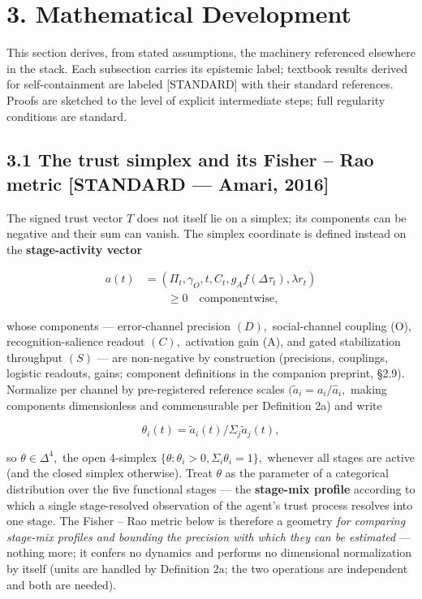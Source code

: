 \documentclass[
]{article}
\begin{document}
\section{3. Mathematical Development}\label{mathematical-development}

This section derives, from stated assumptions, the machinery referenced
elsewhere in the stack. Each subsection carries its epistemic label;
textbook results derived for self-containment are labeled {[}STANDARD{]}
with their standard references. Proofs are sketched to the level of
explicit intermediate steps; full regularity conditions are standard.

\subsection{3.1 The trust simplex and its Fisher -- Rao metric
{[}STANDARD --- Amari,
2016{]}}\label{the-trust-simplex-and-its-fisher-rao-metric-standard-amari-2016}

The signed trust vector \(T\) does not itself lie on a simplex; its
components can be negative and their sum can vanish. The simplex
coordinate is defined instead on the \textbf{stage-activity vector}

\begin{equation}
\begin{split}
a(t) &= ( \Pi_t, \gamma_O,t, C_t, g_A f(\Delta \tau_t), \lambda r_t )\\
&\qquad \geq 0 \quad \text{componentwise,}
\end{split}
\label{eq:activity}
\end{equation}

whose components --- error-channel precision \((D),\) social-channel
coupling (O), recognition-salience readout \((C),\) activation gain (A),
and gated stabilization throughput \((S)\) --- are non-negative by
construction (precisions, couplings, logistic readouts, gains; component
definitions in the companion preprint, §2.9). Normalize per channel by
pre-registered reference scales \((\tilde{a}_i = a_i/\hat{a}_i,\) making
components dimensionless and commensurable per Definition 2a) and write

\begin{equation}
\theta_i(t) = \tilde{a}_i(t) / \Sigma_j \tilde{a}_j(t),
\label{eq:theta}
\end{equation}

so \(\theta \in \Delta^{4},\) the open 4-simplex
\(\{\theta : \theta_i > 0, \Sigma_i \theta_i = 1\},\) whenever all
stages are active (and the closed simplex otherwise). Treat \(\theta\)
as the parameter of a categorical distribution over the five functional
stages --- the \textbf{stage-mix profile} according to which a single
stage-resolved observation of the agent's trust process resolves into
one stage. The Fisher -- Rao metric below is therefore a geometry
\emph{for comparing stage-mix profiles and bounding the precision with
which they can be estimated} --- nothing more; it confers no dynamics
and performs no dimensional normalization by itself (units are handled
by Definition 2a; the two operations are independent and both are
needed).
\end{document}
